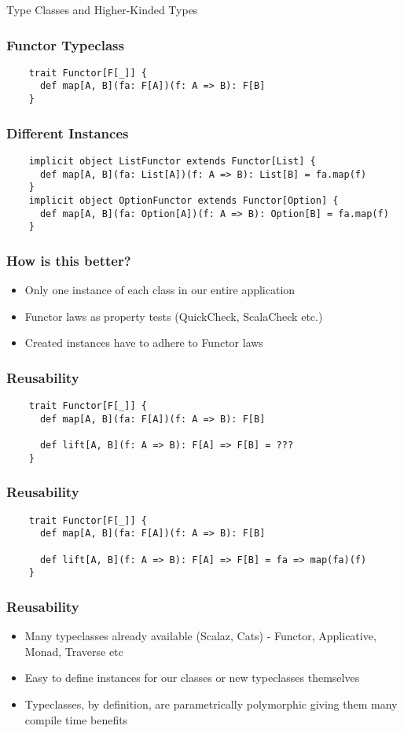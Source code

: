 \begin{section}{Type Classes and Higher-Kinded Types}
\begin{frame}[fragile]
  \frametitle{Functor Typeclass}
  \begin{verbatim}
    trait Functor[F[_]] {
      def map[A, B](fa: F[A])(f: A => B): F[B]
    }
  \end{verbatim}
\end{frame}

\begin{frame}[fragile]
  \frametitle{Different Instances}
  \begin{verbatim}
    implicit object ListFunctor extends Functor[List] {
      def map[A, B](fa: List[A])(f: A => B): List[B] = fa.map(f)
    }
    implicit object OptionFunctor extends Functor[Option] {
      def map[A, B](fa: Option[A])(f: A => B): Option[B] = fa.map(f)
    }
  \end{verbatim}
\end{frame}

\begin{frame}[fragile]
  \frametitle{How is this better?}
  \begin{itemize}
  \item Only one instance of each class in our entire application
  \item Functor laws as property tests (QuickCheck, ScalaCheck etc.)
  \item Created instances have to adhere to Functor laws
  \end{itemize}
\end{frame}

\begin{frame}[fragile]
  \frametitle{Reusability}
  \begin{verbatim}
    trait Functor[F[_]] {
      def map[A, B](fa: F[A])(f: A => B): F[B]

      def lift[A, B](f: A => B): F[A] => F[B] = ???
    }
  \end{verbatim}
\end{frame}

\begin{frame}[fragile]
  \frametitle{Reusability}
  \begin{verbatim}
    trait Functor[F[_]] {
      def map[A, B](fa: F[A])(f: A => B): F[B]

      def lift[A, B](f: A => B): F[A] => F[B] = fa => map(fa)(f)
    }
  \end{verbatim}
\end{frame}
\end{section}

\begin{frame}[fragile]
  \frametitle{Reusability}
  \begin{itemize}
  \item Many typeclasses already available (Scalaz, Cats) - Functor, Applicative, Monad, Traverse etc
  \item Easy to define instances for our classes or new typeclasses themselves
  \item Typeclasses, by definition, are parametrically polymorphic giving them many compile time benefits
  \end{itemize}
\end{frame}
